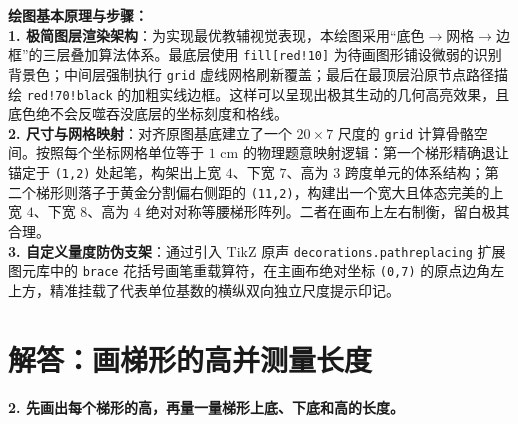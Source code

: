 \vspace{0.6cm}

{\small\color{blue!70!black}
\textbf{绘图基本原理与步骤：}\\
\textbf{1. 极简图层渲染架构}：为实现最优教辅视觉表现，本绘图采用“底色$\to$网格$\to$边框”的三层叠加算法体系。最底层使用 \texttt{fill[red!10]} 为待画图形铺设微弱的识别背景色；中间层强制执行 \texttt{grid} 虚线网格刷新覆盖；最后在最顶层沿原节点路径描绘 \texttt{red!70!black} 的加粗实线边框。这样可以呈现出极其生动的几何高亮效果，且底色绝不会反噬吞没底层的坐标刻度和格线。\\
\textbf{2. 尺寸与网格映射}：对齐原图基底建立了一个 $20 \times 7$ 尺度的 \texttt{grid} 计算骨骼空间。按照每个坐标网格单位等于 $1\text{ cm}$ 的物理题意映射逻辑：第一个梯形精确退让锚定于 \texttt{(1,2)} 处起笔，构架出上宽 $4$、下宽 $7$、高为 $3$ 跨度单元的体系结构；第二个梯形则落子于黄金分割偏右侧距的 \texttt{(11,2)}，构建出一个宽大且体态完美的上宽 $4$、下宽 $8$、高为 $4$ 绝对对称等腰梯形阵列。二者在画布上左右制衡，留白极其合理。\\
\textbf{3. 自定义量度防伪支架}：通过引入 TikZ 原声 \texttt{decorations.pathreplacing} 扩展图元库中的 \texttt{brace} 花括号画笔重载算符，在主画布绝对坐标 \texttt{(0,7)} 的原点边角左上方，精准挂载了代表单位基数的横纵双向独立尺度提示印记。
}


\newpage



\section{解答：画梯形的高并测量长度}

\vspace{0.4cm}

\noindent\textbf{2. 先画出每个梯形的高，再量一量梯形上底、下底和高的长度。}

\vspace{0.8cm}

